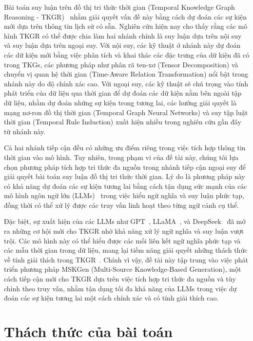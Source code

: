 Bài toán suy luận trên đồ thị tri thức thời gian (Temporal Knowledge Graph Reasoning - TKGR)~\cite{ref_article03} nhằm giải quyết vấn đề này bằng cách dự đoán các sự kiện mới dựa trên thông tin lịch sử có sẵn. Nghiên cứu hiện nay cho thấy rằng các mô hình TKGR có thể được chia làm hai nhánh chính là suy luận dựa trên nội suy và suy luận dựa trên ngoại suy. Với nội suy, các kỹ thuật ở nhánh này dự đoán các dữ kiện mới bằng việc phân tích và khai thác các đặc trưng của dữ kiện đã có trong TKGs, các phương pháp như phân rã ten-xơ (Tensor Decomposition) và chuyển vị quan hệ thời gian (Time-Aware Relation Transformation) nổi bật trong nhánh này do độ chính xác cao. Với ngoại suy, các kỹ thuật sẽ chú trọng vào tính phát triển của dữ liệu qua thời gian để dự đoán các dữ kiện nằm bên ngoài tập dữ liệu, nhằm dự đoán những sự kiện trong tương lai, các hướng giải quyết là mạng nơ-ron đồ thị thời gian (Temporal Graph Neural Networks) và suy tập luật thời gian (Temporal Rule Induction) xuất hiện nhiều trong nghiên cứu gần đây từ nhánh này.

Cả hai nhánh tiếp cận đều có những ưu điểm riêng trong việc tích hợp thông tin thời gian vào mô hình. Tuy nhiên, trong phạm vi của đề tài này, chúng tôi lựa chọn phương pháp tích hợp tri thức đa nguồn trong nhánh tiếp cận ngoại suy để giải quyết bài toán suy luận đồ thị tri thức thời gian. Lý do là phương pháp này có khả năng dự đoán các sự kiện tương lai bằng cách tận dụng sức mạnh của các mô hình ngôn ngữ lớn (LLMs)~\cite{ref_article04} trong việc hiểu ngữ nghĩa và suy luận phức tạp, đồng thời có thể xử lý được các truy vấn linh hoạt theo từng ngữ cảnh cụ thể.

Đặc biệt, sự xuất hiện của các LLMs như GPT~\cite{ref_article05}, LLaMA~\cite{ref_article06}, và DeepSeek~\cite{ref_article07} đã mở ra những cơ hội mới cho TKGR nhờ khả năng xử lý ngữ nghĩa và suy luận vượt trội. Các mô hình này có thể hiểu được các mối liên kết ngữ nghĩa phức tạp và các mẫu thời gian trong dữ liệu, mang lại tiềm năng giải quyết những thách thức về tính giải thích trong TKGR~\cite{ref_article03}. Chính vì vậy, đề tài này tập trung vào việc phát triển phương pháp MSKGen (Multi-Source Knowledge-Based Generation), một cách tiếp cận mới cho TKGR dựa trên việc tích hợp tri thức đa nguồn và tùy chỉnh theo truy vấn, nhằm tận dụng tối đa khả năng của LLMs trong việc dự đoán các sự kiện tương lai một cách chính xác và có tính giải thích cao.


\section{Thách thức của bài toán}

